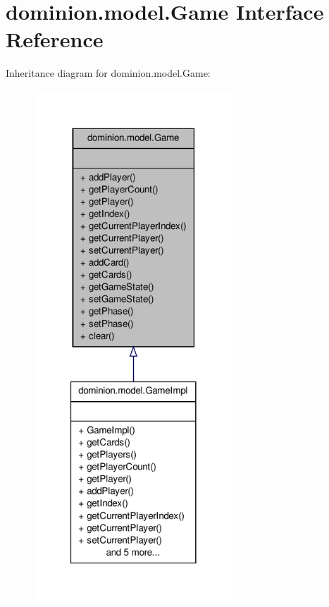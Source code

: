 \hypertarget{interfacedominion_1_1model_1_1Game}{\section{dominion.\-model.\-Game \-Interface \-Reference}
\label{interfacedominion_1_1model_1_1Game}
}


\-Inheritance diagram for dominion.\-model.\-Game\-:
\nopagebreak
\begin{figure}[H]
\begin{center}
\leavevmode
\includegraphics[width=212pt]{interfacedominion_1_1model_1_1Game__inherit__graph}
\end{center}
\end{figure}
